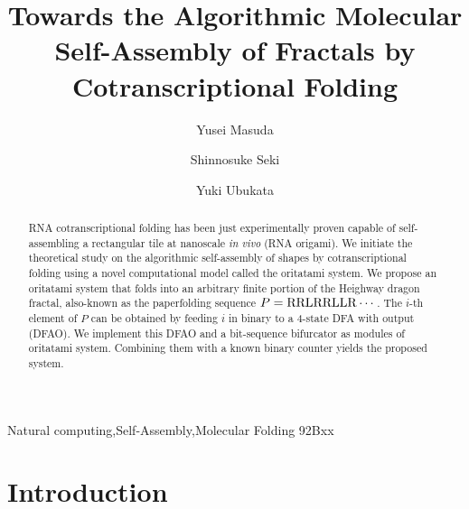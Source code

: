 \documentclass[dvipdfmx,review]{elsarticle}
\begin{document}
\begin{frontmatter}

\title{Towards the Algorithmic Molecular Self-Assembly of Fractals by Cotranscriptional Folding}

\author{Yusei Masuda}
\author{Shinnosuke Seki}
\author{Yuki Ubukata}

\address{Department of Computer and Network Engineering, \\The University of Electro-Communications}
\address{1-5-1, Chofugaoka, Chofu, Tokyo, 1828585, Japan}




\begin{abstract}
RNA cotranscriptional folding has been just experimentally proven capable of self-assembling a rectangular tile at nanoscale {\it in vivo} (RNA origami). 
We initiate the theoretical study on the algorithmic self-assembly of shapes by cotranscriptional folding using a novel computational model called the oritatami system. 
We propose an oritatami system that folds into an arbitrary finite portion of the Heighway dragon fractal, also-known as the paperfolding sequence $P = {\rm RRLRRLLR} \cdots$. 
The $i$-th element of $P$ can be obtained by feeding $i$ in binary to a 4-state DFA with output (DFAO). 
We implement this DFAO and a bit-sequence bifurcator as modules of oritatami system. 
Combining them with a known binary counter yields the proposed system. 
\end{abstract}

\begin{keyword}
Natural computing\sep Self-Assembly\sep Molecular Folding
\MSC[2018] 92Bxx %
\end{keyword}

\end{frontmatter}

\linenumbers

	\section{Introduction}
\end{document}
